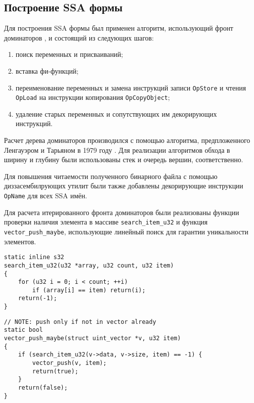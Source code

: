 \documentclass[14pt]{extarticle}
\begin{document}
\subsection{Построение SSA формы}
Для построения SSA формы был применен алгоритм, использующий фронт доминаторов \cite{cyt91}, и состоящий из следующих шагов:
\begin{enumerate}
	\item поиск переменных и присваиваний;
	
	\item вставка фи-функций;
	
	\item переименование переменных и замена инструкций записи \texttt{OpStore} и чтения\\
    \texttt{OpLoad} на инструкции копирования \texttt{OpCopyObject};
	
	\item удаление старых переменных и сопутствующих им декорирующих инструкций.
\end{enumerate}

Расчет дерева доминаторов производился с помощью алгоритма, предпложенного Ленгауэром и Тарьяном в 1979 году \cite{lan79}. Для реализации алгоритмов обхода в ширину и глубину были использованы стек и очередь вершин, соответственно.

Для повышения читаемости полученного бинарного файла с помощью диззасембилрующих утилит были также добавлены декорирующие инструкции \texttt{OpName} для всех SSA имён.

Для расчета итерированного фронта доминаторов были реализованы функции проверки наличия элемента в массиве \texttt{search\_item\_u32} и функция \texttt{vector\_push\_maybe}, использующие линейный поиск для гарантии уникальности элементов.
\begin{lstlisting}[caption={функция линейного поиска}]
static inline s32
search_item_u32(u32 *array, u32 count, u32 item)
{
    for (u32 i = 0; i < count; ++i)
        if (array[i] == item) return(i);
    return(-1);
}
\end{lstlisting}
\begin{lstlisting}[caption={функция добавления уникального элемента в вектор}]
// NOTE: push only if not in vector already
static bool
vector_push_maybe(struct uint_vector *v, u32 item)
{
    if (search_item_u32(v->data, v->size, item) == -1) {
        vector_push(v, item);
        return(true);
    }
    return(false);
}
\end{lstlisting}
~\\ %
\end{document}
